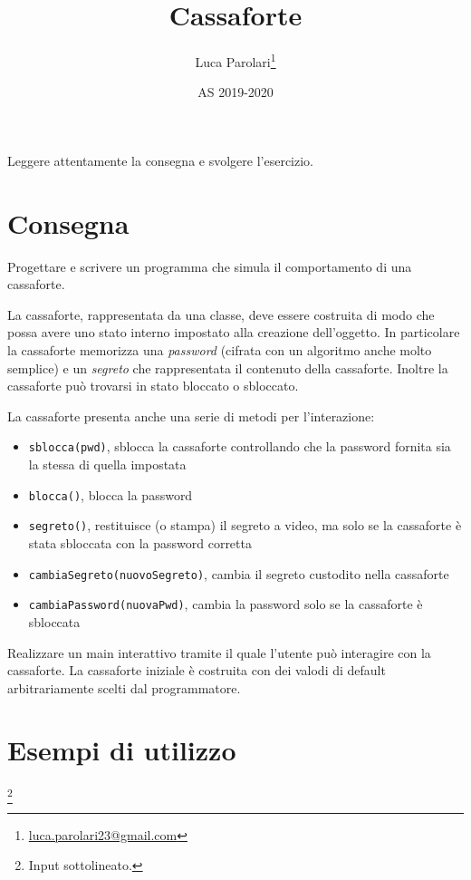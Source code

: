 \documentclass[addpoints,12pt,answers]{exam}
\author{Luca Parolari\footnote{\href{mailto:luca.parolari23@gmail.com}{luca.parolari23@gmail.com}}}
\begin{document}
\title{Cassaforte}
\date{AS 2019-2020}

\maketitle

Leggere attentamente la consegna e svolgere l'esercizio.

\section{Consegna}
Progettare e scrivere un programma che simula il comportamento di una cassaforte.

La cassaforte, rappresentata da una classe, deve essere costruita di modo che possa avere
uno stato interno impostato alla creazione dell'oggetto. In particolare la cassaforte
memorizza una \textit{password} (cifrata con un algoritmo anche molto semplice) e
un \textit{segreto} che rappresentata il contenuto della cassaforte. Inoltre la
cassaforte può trovarsi in stato bloccato o sbloccato.

La cassaforte presenta anche una serie di metodi per l'interazione:
\begin{itemize}
    \item \texttt{sblocca(pwd)}, sblocca la cassaforte controllando che la password fornita sia la stessa di quella impostata
    \item \texttt{blocca()}, blocca la password
    \item \texttt{segreto()}, restituisce (o stampa) il segreto a video, ma solo se la cassaforte è stata sbloccata con la password corretta
    \item \texttt{cambiaSegreto(nuovoSegreto)}, cambia il segreto custodito nella cassaforte
    \item \texttt{cambiaPassword(nuovaPwd)}, cambia la password solo se la cassaforte è sbloccata
\end{itemize}

Realizzare un main interattivo tramite il quale l'utente può interagire con la cassaforte.
La cassaforte iniziale è costruita con dei valodi di default arbitrariamente scelti dal programmatore.

\newpage

\section{Esempi di utilizzo}
\footnote{Input sottolineato.}
\end{document}
